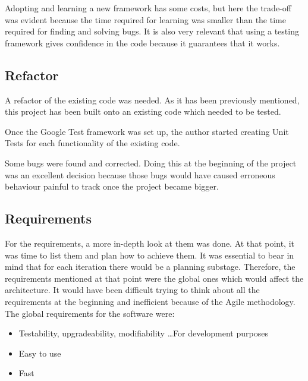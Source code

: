 Adopting and learning a new framework has some costs, but here the trade-off was evident because the time required for learning was smaller than the time required for finding and solving bugs. It is also very relevant that using a testing framework gives confidence in the code because it guarantees that it works.  

\subsection{Refactor}

A refactor of the existing code was needed. As it has been previously mentioned, this project has been built onto an existing code which needed to be tested.  



Once the Google Test framework was set up, the author started creating Unit Tests for each functionality of the existing code.  





Some bugs were found and corrected. Doing this at the beginning of the project was an excellent decision because those bugs would have caused erroneous behaviour painful to track once the project became bigger. 

\subsection{Requirements}
For the requirements, a more in-depth look at them was done. At that point, it was time to list them and plan how to achieve them. It was essential to bear in mind that for each iteration there would be a planning substage. Therefore, the requirements mentioned at that point were the global ones which would affect the architecture. It would have been difficult trying to think about all the requirements at the beginning and inefficient because of the Agile methodology. The global requirements for the software were: 

\begin{itemize}
	\item Testability, upgradeability, modifiability \ldots For development purposes
	\item Easy to use
	\item Fast
\end{itemize}




